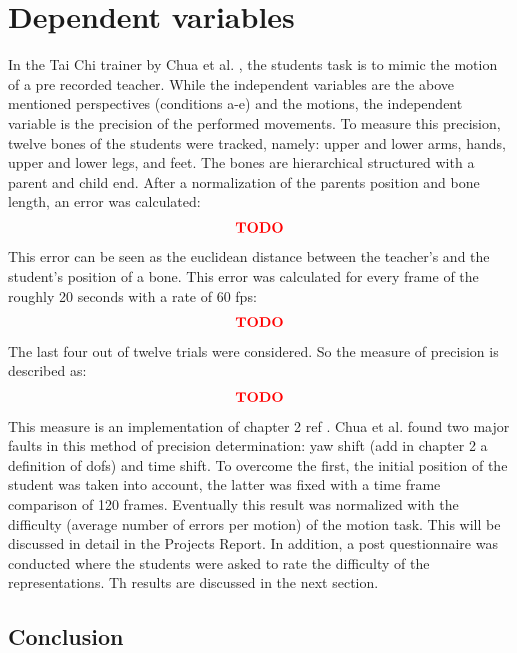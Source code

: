 \section{Dependent variables}
In the Tai Chi trainer by Chua et al. \cite{Chua}, the students task is to mimic the motion of a pre recorded teacher. While the independent variables are the above mentioned perspectives (conditions a-e) and the motions, the independent variable is the precision of the performed movements. To measure this precision, twelve bones of the students were tracked, namely: upper and lower arms, hands, upper and lower legs, and feet. The bones are hierarchical structured with a parent and child end. After a normalization of the parents position and bone length, an error was calculated:
\begin{equation}
	\textcolor{red}{\textbf{TODO}}
\end{equation}
This error can be seen as the euclidean distance between the teacher's and the student's position of a bone. This error was calculated for every frame of the roughly 20 seconds with a rate of 60 fps:
\begin{equation}
	\textcolor{red}{\textbf{TODO}}
\end{equation}
The last four out of twelve trials were considered. So the measure of precision is described as:
\begin{equation}
	\textcolor{red}{\textbf{TODO}}
\end{equation}
This measure is an implementation of chapter 2 ref \todo.
Chua et al. found two major faults in this method of precision determination: yaw shift (\todo add in chapter 2 a definition of dofs) and time shift. To overcome the first, the initial position of the student was taken into account, the latter was fixed with a time frame comparison of 120 frames. Eventually this result was normalized with the difficulty (average number of errors per motion) of the motion task. This will be discussed in detail in the Projects Report. In addition, a post questionnaire was conducted where the students were asked to rate the difficulty of the representations. Th results are discussed in the next section.

\subsection{Conclusion}

